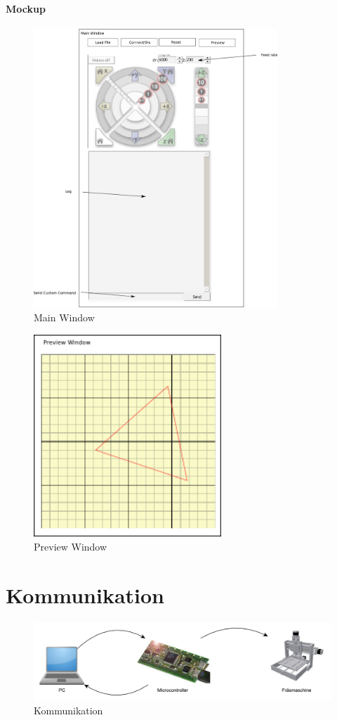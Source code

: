 \documentclass[11pt,a4paper,bibtotoc,oneside]{scrbook}
\begin{document}
\subsubsection{Mockup}
    \begin{figure}[H]
    \centering
        \includegraphics[width=260pt]{./picture/gui_main.png}
        \caption{\label{main}{Main Window}}
    \end{figure}
    
    \begin{figure}[H]
    \centering
        \includegraphics[width=200pt]{./picture/gui_preview.png}
        \caption{\label{main}{Preview Window}}
    \end{figure}

\chapter{Kommunikation}
\begin{figure}[!ht]
    \centering
        \includegraphics[width=360pt]{./picture/Kommunikation.pdf}
        \caption{\label{lm324}{Kommunikation}}
\end{figure}
\end{document}
